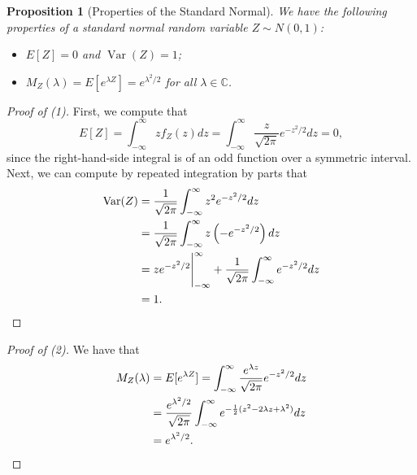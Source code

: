 \documentclass[12pt,reqno]{article}
\theoremstyle{plain}
\newtheorem{prop}[theorem]{Proposition}
\theoremstyle{definition}
\begin{document}
\begin{prop}[Properties of the Standard Normal]
We have the following properties of a standard normal random variable 
$Z \sim N(0, 1)$:
\begin{itemize} 

\item[(1)] $E[Z] = 0$ and $\operatorname{Var}(Z) = 1$; 
\item[(2)] $M_Z(\lambda) = E[e^{\lambda Z}] = e^{\lambda^2/2}$ for all 
     $\lambda \in \mathbb{C}$. 
     
\end{itemize} 
\end{prop} 
\begin{proof}[Proof of (1)]
First, we compute that 
\[
E[Z] = \int_{-\infty}^{\infty} z f_Z(z) dz = \int_{-\infty}^{\infty} 
     \frac{z}{\sqrt{2\pi}} e^{-z^2/2} dz = 0, 
\]
since the right-hand-side integral is of an odd function over a symmetric 
interval. Next, we can compute by repeated integration by parts that 
\begin{align*} 
\operatorname{Var}(Z) & = \frac{1}{\sqrt{2\pi}} \int_{-\infty}^{\infty} 
     z^2 e^{-z^2/2} dz \\ 
     & = \frac{1}{\sqrt{2\pi}} \int_{-\infty}^{\infty} z \left( 
     -e^{-z^2/2}\right) dz \\ 
     & = ze^{-z^2/2} \Biggr\rvert_{-\infty}^{\infty} + 
     \frac{1}{\sqrt{2\pi}} \int_{-\infty}^{\infty} e^{-z^2/2} dz \\ 
     & = 1. 
     \qedhere
\end{align*} 
\end{proof} 
\begin{proof}[Proof of (2)]
We have that 
\begin{align*} 
M_Z(\lambda) & = E[e^{\lambda Z}] = \int_{-\infty}^{\infty} 
     \frac{e^{\lambda z}}{\sqrt{2\pi}} e^{-z^2/2} dz \\ 
     & = \frac{e^{\lambda^2/2}}{\sqrt{2\pi}} \int_{-\infty}^{\infty} 
     e^{-\frac{1}{2}(z^2-2\lambda z+\lambda^2)} dz \\ 
     & = e^{\lambda^2 / 2}. 
     \qedhere 
\end{align*} 
\end{proof} 
\end{document}
